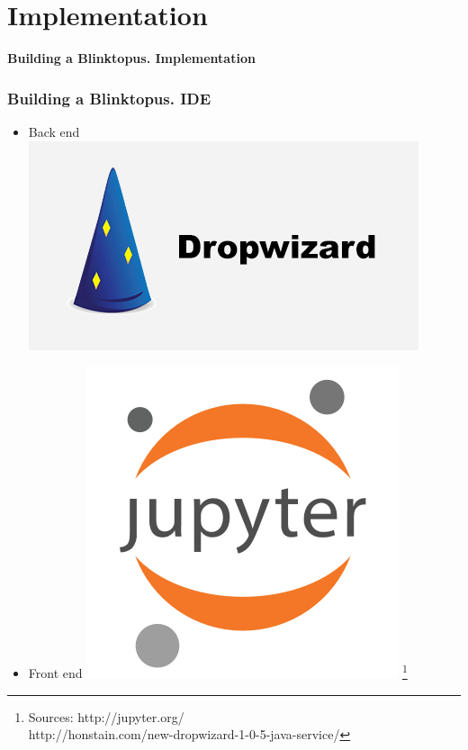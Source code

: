 \documentclass{beamer}
\begin{document}
\section{Implementation}

\begin{frame}
\hspace{0.2 cm} \textbf{\fontsize{14}{12}\selectfont Building a Blinktopus. Implementation}
\end{frame}

\begin{frame}
\frametitle{Building a Blinktopus. IDE}
\begin{itemize}
\item{Back end}
\includegraphics[scale=0.3]{img/dropwizard.png}
\vspace{0.25 cm}
\item{Front end}
\includegraphics[scale=0.2]{img/jpnotebook.png}
\footnote{\tiny 
Sources: http://jupyter.org/\\
http://honstain.com/new-dropwizard-1-0-5-java-service/}
\end{itemize}
\end{frame}
\end{document}

